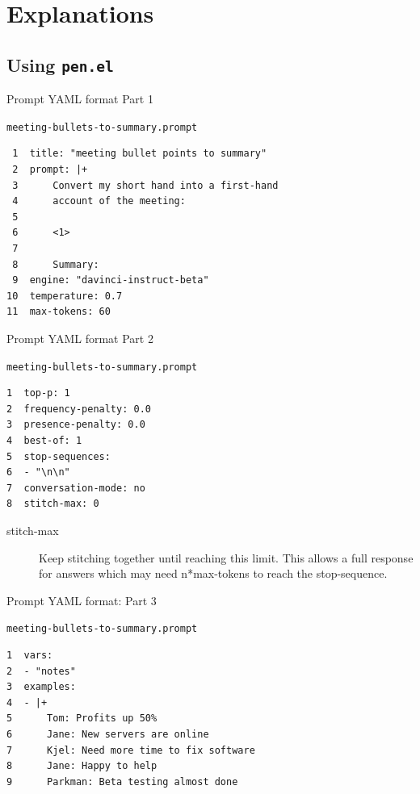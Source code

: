 \documentclass[presentation]{beamer}
\begin{document}
\section{Explanations}
\label{sec:orgaecd27e}
\subsection{Using \texttt{pen.el}}
\label{sec:orgff8755a}
\begin{frame}[label={sec:orgefd0f4d},fragile]{Prompt YAML format Part 1}
 \begin{block}{\texttt{meeting-bullets-to-summary.prompt}}
\begin{verbatim}
 1  title: "meeting bullet points to summary"
 2  prompt: |+
 3      Convert my short hand into a first-hand
 4      account of the meeting:
 5  
 6      <1>
 7  
 8      Summary:
 9  engine: "davinci-instruct-beta"
10  temperature: 0.7
11  max-tokens: 60
\end{verbatim}
\end{block}
\end{frame}

\begin{frame}[label={sec:org1caa87c},fragile]{Prompt YAML format Part 2}
 \begin{block}{\texttt{meeting-bullets-to-summary.prompt}}
\begin{verbatim}
1  top-p: 1
2  frequency-penalty: 0.0
3  presence-penalty: 0.0
4  best-of: 1
5  stop-sequences:
6  - "\n\n"
7  conversation-mode: no
8  stitch-max: 0
\end{verbatim}

\begin{description}
\item[{stitch-max}] Keep stitching together until reaching this limit.
This allows a full response for answers which may need n*max-tokens to reach the stop-sequence.
\end{description}
\end{block}
\end{frame}

\begin{frame}[label={sec:org3deaabf},fragile]{Prompt YAML format: Part 3}
 \begin{block}{\texttt{meeting-bullets-to-summary.prompt}}
\begin{verbatim}
1  vars:
2  - "notes"
3  examples:
4  - |+
5      Tom: Profits up 50%
6      Jane: New servers are online
7      Kjel: Need more time to fix software
8      Jane: Happy to help
9      Parkman: Beta testing almost done
\end{verbatim}
\end{block}
\end{frame}
\end{document}
